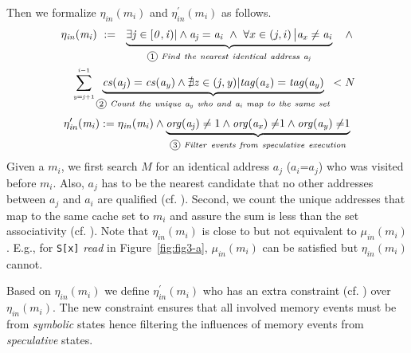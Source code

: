 \documentclass[sigconf]{acmart}
\newcommand*\circled[1]{\tikz[baseline=(char.base)]{
				\node[shape=circle,draw,inner sep=1pt] (char) {\scriptsize{#1}};}}
\begin{document}
Then we formalize $\mathit{\eta_{in}(m_i)}$ and $\mathit{\eta^\prime_{in}(m_i)}$ as follows. 
%
\begin{multline}
  \label{eqn:hc1}
    \mathit{\eta_{in}(m_i)}~:=~~ 
     \underbrace{ 
      \exists\mathit{j}\in[\mathit{0,i})|
      \wedge 
      \mathit{a_j}=\mathit{a_i} 
    ~\wedge~
      {\forall}x\in\left(j,i\right)\big|\mathit{a_x}\ne\mathit{a_i}
    }_{{\circled{1}}\mathit{~Find~the~nearest~identical~address~a_j}}
		~~~\wedge 
		\\
    ~~~~\sum_{{\scriptscriptstyle \mathit{y=j}+1}}^{{\scriptscriptstyle \mathit{i-}1}} 
    \underbrace{
      \mathit{cs(a_j)}=\mathit{cs(a_y)} 
      \wedge
      \nexists\mathit{z}\in(\mathit{j,y})|\mathit{tag(a_z)}=\mathit{tag(a_y)}
    }_{{\circled{2}}\mathit{~Count~the~unique~a_y~who~and~a_i~map~to~the~same~set}}
    <N
\end{multline}
\vspace{.2ex}
\begin{multline}
  \label{eqn:hc2}
    \mathit{\eta^\prime_{in}(m_i)}:=\mathit{\eta_{in}(m_i)}\wedge
    \underbrace{
      \mathit{org(a_j)}\ne1 
      \wedge
      \mathit{org(a_x)\ne}1 
      \wedge
      \mathit{org(a_y)\ne}1 
    }_{{\circled{3}}\mathit{~Filter~events~from~speculative~execution}}
\end{multline}
%
%
Given a $\mathit{m_i}$, we first search $\mathit{M}$ for an identical 
address $\mathit{a_j}$ ($\mathit{a_i}$=$\mathit{a_j}$) who was 
visited before $\mathit{m_i}$. Also, $\mathit{a_j}$ has to be the nearest 
candidate that no other addresses between $\mathit{a_j}$ and $\mathit{a_i}$ 
are qualified (cf. \circled{1}). Second, we count the unique addresses that 
map to the same cache set to $\mathit{m_i}$ and assure the sum is less than 
the set associativity (cf. \circled{2}). Note that $\mathit{\eta_{in}(m_i)}$ 
is close to but not equivalent to $\mathit{\mu_{in}(m_i)}$. E.g., for 
\texttt{S[x]} \textit{read} in Figure~\ref{fig:fig3-a}, $\mathit{\mu_{in}(m_i)}$ 
can be satisfied but $\mathit{\eta_{in}(m_i)}$ cannot.

Based on $\mathit{\eta_{in}(m_i)}$ we define $\mathit{\eta^\prime_{in}(m_i)}$
who has an extra constraint (cf. \circled{3}) over $\mathit{\eta_{in}(m_i)}$. 
The new constraint ensures that all involved memory events must be from 
\textit{symbolic} states hence filtering the influences of memory events 
from \textit{speculative} states.
\end{document}
